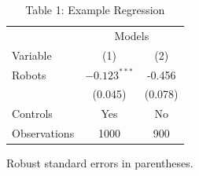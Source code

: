 \begin{table}[htbp]
\centering
\caption{Table 1: Example Regression}
\begin{threeparttable}
\begin{tabular}{lcc}
\hline
 & \multicolumn{2}{c}{Models} \\
Variable & (1) & (2) \\
Robots & $-0.123^{***}$ & -0.456 \\
 & (0.045) & (0.078) \\
Controls & Yes & No \\
Observations & 1000 & 900 \\
\hline
\end{tabular}
\begin{tablenotes}[flushleft]
\item Robust standard errors in parentheses.
\end{tablenotes}
\end{threeparttable}
\end{table}
